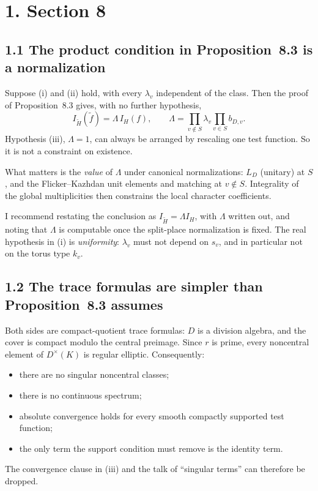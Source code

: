 \documentclass[11pt]{article}
\begin{document}
\section*{1. Section 8}

\subsection*{1.1 The product condition in Proposition~8.3 is a normalization}
Suppose (i) and (ii) hold, with every $\lambda_v$ independent of the
class. Then the proof of Proposition~8.3 gives, with no further
hypothesis,
\[
I_{\widetilde H}(\widetilde f)=\Lambda\,I_H(f),\qquad
\Lambda=\prod_{v\notin S}\lambda_v\prod_{v\in S}b_{D,v}.
\]
Hypothesis (iii), $\Lambda=1$, can always be arranged by rescaling one
test function. So it is not a constraint on existence.

What matters is the \emph{value} of $\Lambda$ under canonical
normalizations: $L_D$ (unitary) at $S$, and the Flicker--Kazhdan unit
elements and matching at $v\notin S$. Integrality of the global
multiplicities then constrains the local character coefficients.

I recommend restating the conclusion as $I_{\widetilde H}=\Lambda I_H$,
with $\Lambda$ written out, and noting that $\Lambda$ is computable
once the split-place normalization is fixed. The real hypothesis in (i)
is \emph{uniformity}: $\lambda_v$ must not depend on $s_v$, and in
particular not on the torus type $k_v$.

\subsection*{1.2 The trace formulas are simpler than Proposition~8.3 assumes}
Both sides are compact-quotient trace formulas: $D$ is a division
algebra, and the cover is compact modulo the central preimage. Since
$r$ is prime, every noncentral element of $D^\times(K)$ is regular
elliptic. Consequently:
\begin{itemize}
\item there are no singular noncentral classes;
\item there is no continuous spectrum;
\item absolute convergence holds for every smooth compactly supported
test function;
\item the only term the support condition must remove is the identity
term.
\end{itemize}
The convergence clause in (iii) and the talk of ``singular terms'' can
therefore be dropped.
\end{document}
